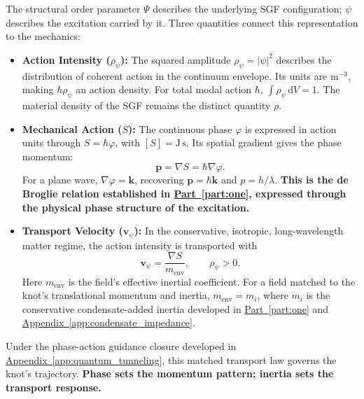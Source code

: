 The structural order parameter $\Psi$ describes the underlying SGF configuration; $\psi$ describes the excitation carried by it. Three quantities connect this representation to the mechanics:

\begin{itemize}

    \item \textbf{Action Intensity ($\rho_\psi$):}
    The squared amplitude $\rho_\psi=|\psi|^2$ describes the distribution of coherent action in the continuum envelope. Its units are $\mathrm m^{-3}$, making $\hbar\rho_\psi$ an action density. For total modal action $\hbar$, $\int\rho_\psi\,\mathrm dV=1$. The material density of the SGF remains the distinct quantity $\rho$.

    \item \textbf{Mechanical Action ($S$):}
    The continuous phase $\varphi$ is expressed in action units through $S=\hbar\varphi$, with $[S]=\mathrm{J\,s}$. Its spatial gradient gives the phase momentum:
    \begin{equation}
        \boxed{
        \mathbf p
        =
        \nabla S
        =
        \hbar\nabla\varphi.
        }
    \end{equation}
    For a plane wave, $\nabla\varphi=\mathbf k$, recovering $\mathbf p=\hbar\mathbf k$ and $p=h/\lambda$. \textbf{This is the de Broglie relation established in \hyperref[part:one]{Part~\ref*{part:one}}, expressed through the physical phase structure of the excitation.}

    \item \textbf{Transport Velocity ($\mathbf v_\psi$):}
    In the conservative, isotropic, long-wavelength matter regime, the action intensity is transported with
    \begin{equation}
        \mathbf v_\psi
        =
        \frac{\nabla S}{m_{\mathrm{env}}},
        \qquad
        \rho_\psi>0.
    \end{equation}
    Here $m_{\mathrm{env}}$ is the field's effective inertial coefficient. For a field matched to the knot's translational momentum and inertia, $m_{\mathrm{env}}=m_i$, where $m_i$ is the conservative condensate-added inertia developed in \hyperref[part:one]{Part~\ref*{part:one}} and \hyperref[app:condensate_impedance]{Appendix~\ref*{app:condensate_impedance}}.

\end{itemize}

Under the phase-action guidance closure developed in \hyperref[app:quantum_tunneling]{Appendix~\ref*{app:quantum_tunneling}}, this matched transport law governs the knot's trajectory. \textbf{Phase sets the momentum pattern; inertia sets the transport response.}

